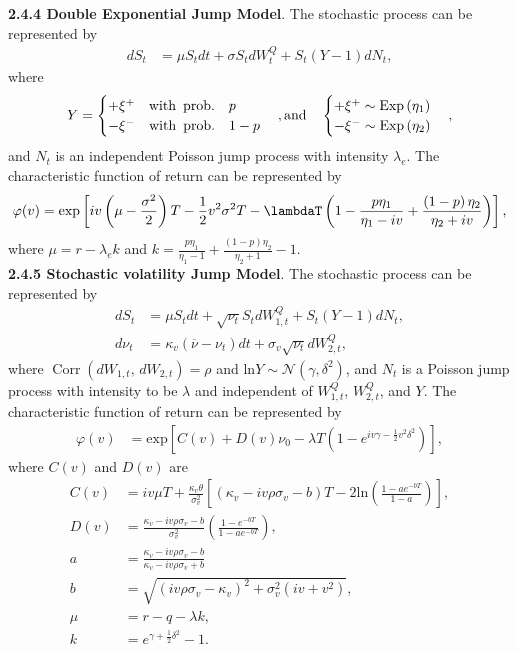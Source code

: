 \noindent\textbf{2.4.4 Double Exponential Jump Model}.
The stochastic process can be represented by
\begin{align*}
    d S_t & = \mu S_t d t+\sigma S_t d W_t^Q+S_t(Y-1) d N_t,
\end{align*}
where
$$
Y = 
\begin{cases}
+\xi^+ \quad {\rm with\, \, \, prob.} \quad p \\
-\xi^- \quad {\rm with\, \, \, prob.} \quad 1-p
\end{cases}
{\rm , and} \quad
\begin{cases}
+\xi^+ \sim \rm{Exp}\left( \eta_1 \right) \\
-\xi^- \sim \rm{Exp}\left( \eta_2 \right)
\end{cases},
$$
and $N_t$ is an independent Poisson jump process with intensity $\lambda_e$. The characteristic function of return can be represented by
\begin{align*}
\varphi(v) & =\mathrm{exp} \left[iv\left(\mu - \frac{\sigma^2}{2}\right)T - \frac{1}{2}v^2\sigma^2T-\lambdaT\left(1- \frac{p\eta_1}{\eta_1 - iv} + \frac{\left(1-p\right)\eta_2}{\eta_2 + iv}\right)\right],\\
\end{align*}
where $\mu = r - \lambda_e k$ and $k = \frac{p\eta_1}{\eta_1 - 1} + \frac{\left(1-p\right)\eta_2}{\eta_2 + 1}-1$. \\



\noindent\textbf{2.4.5 Stochastic volatility Jump Model}.
The stochastic process can be represented by
\begin{align*}
    d S_t & = \mu S_t d t+\sqrt{\nu_t} S_t d W_{1, t}^Q+S_t(Y-1) d N_t, \\
    d \nu_t & = \kappa_v\left(\overline{\nu}-\nu_t\right) d t+\sigma_v \sqrt{\nu_t} d W_{2, t}^Q,
\end{align*}
where $\operatorname{Corr}\left(d W_{1, t}, \, d W_{2, t}\right)=\rho$ and $\mathrm{ln} Y \sim \mathcal{N}\left(\gamma, \delta^{2}\right)$, and $N_t$ is a Poisson jump process with intensity to be $\lambda$ and independent of $W^Q_{1,t}$, $W^Q_{2,t}$, and $Y$. The characteristic function of return can be represented by
\begin{align*}
\varphi(v) & =\mathrm{exp} \left[C(v)+D(v) \nu_0-\lambda T\left(1-e^{i v \gamma-\frac{1}{2} v^2 \delta^2}\right)\right],
\end{align*}
where $C(v)$ and $D(v)$ are
\begin{align*}
C(v) & =i v \mu T+\frac{\kappa_v \theta}{\sigma_v^2}\left[\left(\kappa_v-i v \rho \sigma_v-b\right) T-2 \mathrm{ln} \left(\frac{1-a e^{-b T}}{1-a}\right)\right], \\
D(v) & =\frac{\kappa_v-i v \rho \sigma_v-b}{\sigma_v^2}\left(\frac{1-e^{-b T}}{1-a e^{-b T}}\right), \\
a & =\frac{\kappa_v-i v \rho \sigma_v-b}{\kappa_v-i v \rho \sigma_v+b} \\
b & =\sqrt{(i v \rho \sigma_v-\kappa_v)^2+\sigma_v^2\left(i v+v^2\right)}, \\
\mu & =r-q-\lambda k, \\ 
k &= e^{\gamma+\frac{1}{2} \delta^2}-1.
\end{align*}



